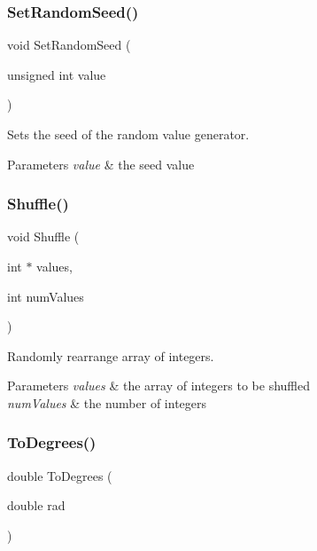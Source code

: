 \subsubsection{\texorpdfstring{Set\+Random\+Seed()}{SetRandomSeed()}}
{\footnotesize\ttfamily void Set\+Random\+Seed (\begin{DoxyParamCaption}\item[{unsigned int}]{value }\end{DoxyParamCaption})}

Sets the seed of the random value generator.


\begin{DoxyParams}{Parameters}
{\em value} & the seed value \\
\hline
\end{DoxyParams}
\mbox{\label{group__math__group_ga9dffb844db4ac8823c6c957448576ed8}} 
\subsubsection{\texorpdfstring{Shuffle()}{Shuffle()}}
{\footnotesize\ttfamily void Shuffle (\begin{DoxyParamCaption}\item[{int $\ast$}]{values,  }\item[{int}]{num\+Values }\end{DoxyParamCaption})}

Randomly rearrange array of integers.


\begin{DoxyParams}{Parameters}
{\em values} & the array of integers to be shuffled \\
\hline
{\em num\+Values} & the number of integers \\
\hline
\end{DoxyParams}
\mbox{\label{group__math__group_gab6efcc6e24e777db0fe5e0d0955c2b2d}} 
\subsubsection{\texorpdfstring{To\+Degrees()}{ToDegrees()}}
{\footnotesize\ttfamily double To\+Degrees (\begin{DoxyParamCaption}\item[{double}]{rad }\end{DoxyParamCaption})}

